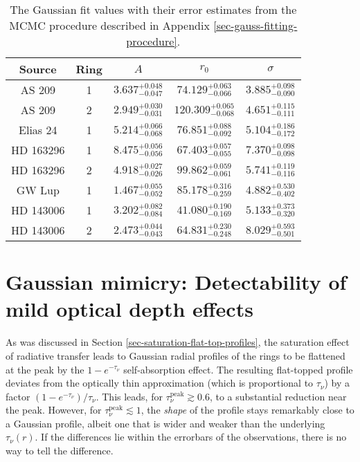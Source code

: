 \documentclass{aa}
\begin{document}
\begin{table}
\begin{center}
\begin{tabular}{|cc|ccc|}
\hline
\hline
Source & Ring & $A$ & $r_0$ & $\sigma$ \\
\hline
AS 209     & 1 & $  3.637_{-0.047}^{+0.048}$ & $ 74.129_{-0.066}^{+0.063}$ & $  3.885_{-0.090}^{+0.098}$  \\
AS 209     & 2 & $  2.949_{-0.031}^{+0.030}$ & $120.309_{-0.068}^{+0.065}$ & $  4.651_{-0.111}^{+0.115}$  \\
Elias 24   & 1 & $  5.214_{-0.068}^{+0.066}$ & $ 76.851_{-0.092}^{+0.088}$ & $  5.104_{-0.172}^{+0.186}$  \\
HD 163296  & 1 & $  8.475_{-0.056}^{+0.056}$ & $ 67.403_{-0.055}^{+0.057}$ & $  7.370_{-0.098}^{+0.098}$  \\
HD 163296  & 2 & $  4.918_{-0.026}^{+0.027}$ & $ 99.862_{-0.061}^{+0.059}$ & $  5.741_{-0.116}^{+0.119}$  \\
GW Lup     & 1 & $  1.467_{-0.052}^{+0.055}$ & $ 85.178_{-0.259}^{+0.316}$ & $  4.882_{-0.402}^{+0.530}$  \\
HD 143006  & 1 & $  3.202_{-0.084}^{+0.082}$ & $ 41.080_{-0.169}^{+0.190}$ & $  5.133_{-0.320}^{+0.373}$  \\
HD 143006  & 2 & $  2.473_{-0.043}^{+0.044}$ & $ 64.831_{-0.248}^{+0.230}$ & $  8.029_{-0.501}^{+0.593}$  \\
\hline
\hline
\end{tabular}
\end{center}
\caption{\label{tab-gauss-fit-errors}The Gaussian fit values with their error
  estimates from the MCMC procedure described in Appendix \ref{sec-gauss-fitting-procedure}.}
\end{table}


\section{Gaussian mimicry: Detectability of mild optical depth effects}
\label{sec-mimicry-flat-topped}
%
As was discussed in Section \ref{sec-saturation-flat-top-profiles}, the
saturation effect of radiative transfer leads to Gaussian radial profiles of the
rings to be flattened at the peak by the $1-e^{-\tau_\nu}$ self-absorption
effect. The resulting flat-topped profile deviates from the optically thin
approximation (which is proportional to $\tau_\nu$) by a factor
$(1-e^{-\tau_\nu})/\tau_\nu$. This leads, for $\tau_\nu^{\mathrm{peak}}\gtrsim
0.6$, to a substantial reduction near the peak. However, for
$\tau_\nu^{\mathrm{peak}}\lesssim 1$, the {\em shape} of the profile stays
remarkably close to a Gaussian profile, albeit one that is wider and weaker than
the underlying $\tau_\nu(r)$. If the differences lie within the errorbars of the
observations, there is no way to tell the difference.
\end{document}
